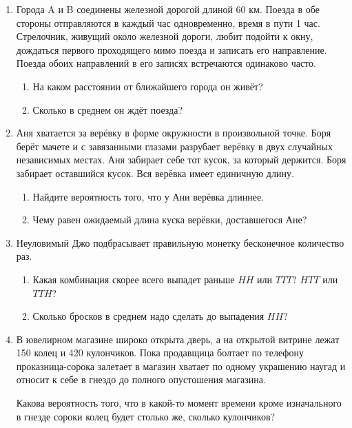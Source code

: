 \documentclass[12pt]{article}
\theoremstyle{definition}
\begin{document}
\begin{enumerate}
    \item Города A и B соединены железной дорогой длиной 60 км. 
    Поезда в обе стороны отправляются в каждый час одновременно, время в пути 1 час. 
    Стрелочник, живущий около железной дороги, любит подойти к окну, 
    дождаться первого проходящего мимо поезда и записать его направление. 
    Поезда обоих направлений в его записях встречаются одинаково часто. 

    \begin{enumerate}
        \item На каком расстоянии от ближайшего города он живёт?
        \item Сколько в среднем он ждёт поезда?
    \end{enumerate}
    
    \item Аня хватается за верёвку в форме окружности в произвольной точке.
    Боря берёт мачете и с завязанными глазами разрубает
    верёвку в двух случайных независимых местах. Аня забирает себе тот кусок,
    за который держится. Боря забирает оставшийся кусок. Вся верёвка имеет единичную длину.
    \begin{enumerate}
    \item Найдите вероятность того, что у Ани верёвка длиннее.
    \item Чему равен ожидаемый длина куска верёвки, доставшегося Ане?
    \end{enumerate}

    \item Неуловимый Джо подбрасывает правильную монетку бесконечное количество раз. 
    \begin{enumerate}
        \item Какая комбинация скорее всего выпадет раньше $HH$ или $TTT$? $HTT$ или $TTH$?
        \item Сколько бросков в среднем надо сделать до выпадения $HH$?
    \end{enumerate}

    \item В ювелирном магазине широко открыта дверь, а на открытой витрине лежат 150 колец и 420 кулончиков. 
    Пока продавщица болтает по телефону проказница-сорока залетает в магазин хватает по одному украшению наугад и относит к себе в гнездо
     до полного опустошения магазина.
    
    Какова вероятность того, что в какой-то момент времени кроме изначального в гнезде сороки колец будет столько же, сколько кулончиков?


\end{enumerate}
\end{document}
